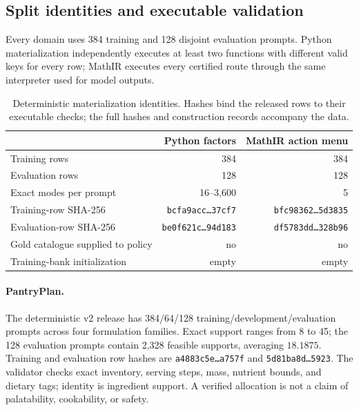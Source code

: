 \subsection{Split identities and executable validation}
\label{app:data-materialization}

Every domain uses 384 training and 128 disjoint evaluation prompts.
Python materialization independently executes at least two functions with
different valid keys for every row; MathIR executes every certified route
through the same interpreter used for model outputs.

\begin{table}[H]
\centering
\caption{Deterministic materialization identities. Hashes bind the released rows to their executable checks; the full hashes and construction records accompany the data.}
\label{tab:materialization-identities}
\small
\begin{tabular}{@{}lrr@{}}
\toprule
& \textbf{Python factors} & \textbf{MathIR action menu} \\
\midrule
Training rows & 384 & 384 \\
Evaluation rows & 128 & 128 \\
Exact modes per prompt & 16--3,600 & 5 \\
Training-row SHA-256 & \texttt{bcfa9acc\ldots37cf7} & \texttt{bfc98362\ldots5d3835} \\
Evaluation-row SHA-256 & \texttt{be0f621c\ldots94d183} & \texttt{df5783dd\ldots328b96} \\
Gold catalogue supplied to policy & no & no \\
Training-bank initialization & empty & empty \\
\bottomrule
\end{tabular}
\end{table}

\paragraph{PantryPlan.}
\label{app:data-pantry}
The deterministic v2 release has 384/64/128 training/development/evaluation
prompts across four formulation families. Exact support ranges from 8 to 45;
the 128 evaluation prompts contain 2,328 feasible supports, averaging
$18.1875$. Training and evaluation row hashes are
\texttt{a4883c5e\ldots a757f} and \texttt{5d81ba8d\ldots5923}.
The validator checks exact inventory, serving steps, mass, nutrient bounds,
and dietary tags; identity is ingredient support. A verified allocation is
not a claim of palatability, cookability, or safety.

